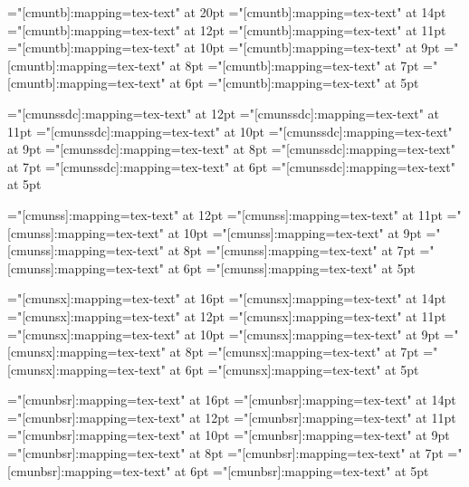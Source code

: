 \font\twentyttbf="[cmuntb]:mapping=tex-text"     at 20pt
\font\fourteenttbf="[cmuntb]:mapping=tex-text"   at 14pt
\font\twelvettbf="[cmuntb]:mapping=tex-text"     at 12pt
\font\eleventtbf="[cmuntb]:mapping=tex-text"     at 11pt
\font\tenttbf="[cmuntb]:mapping=tex-text"        at 10pt
\font\ninettbf="[cmuntb]:mapping=tex-text"       at 9pt
\font\eighttbft="[cmuntb]:mapping=tex-text"      at 8pt
\font\seventtbf="[cmuntb]:mapping=tex-text"      at 7pt
\font\sixttbf="[cmuntb]:mapping=tex-text"        at 6pt
\font\fivettbf="[cmuntb]:mapping=tex-text"       at 5pt

\font\twelvessdc="[cmunssdc]:mapping=tex-text"  at 12pt
\font\elevenssdc="[cmunssdc]:mapping=tex-text"  at 11pt
\font\tenssdc="[cmunssdc]:mapping=tex-text"     at 10pt
\font\ninessdc="[cmunssdc]:mapping=tex-text"    at 9pt
\font\eightssdc="[cmunssdc]:mapping=tex-text"   at 8pt
\font\sevenssdc="[cmunssdc]:mapping=tex-text"   at 7pt
\font\sixssdc="[cmunssdc]:mapping=tex-text"     at 6pt
\font\fivessdc="[cmunssdc]:mapping=tex-text"    at 5pt

\font\twelvess="[cmunss]:mapping=tex-text"      at 12pt
\font\elevenss="[cmunss]:mapping=tex-text"      at 11pt
\font\tenss="[cmunss]:mapping=tex-text"         at 10pt
\font\niness="[cmunss]:mapping=tex-text"        at 9pt
\font\eightss="[cmunss]:mapping=tex-text"       at 8pt
\font\sevenss="[cmunss]:mapping=tex-text"       at 7pt
\font\sixss="[cmunss]:mapping=tex-text"         at 6pt
\font\fivess="[cmunss]:mapping=tex-text"        at 5pt

\font\sixteenssbf="[cmunsx]:mapping=tex-text"  at 16pt
\font\fourteenssbf="[cmunsx]:mapping=tex-text" at 14pt
\font\twelvessbf="[cmunsx]:mapping=tex-text"   at 12pt
\font\elevenssbf="[cmunsx]:mapping=tex-text"   at 11pt
\font\tenssbf="[cmunsx]:mapping=tex-text"      at 10pt
\font\ninessbf="[cmunsx]:mapping=tex-text"     at 9pt
\font\eightssbf="[cmunsx]:mapping=tex-text"    at 8pt
\font\sevenssbf="[cmunsx]:mapping=tex-text"    at 7pt
\font\sixssbf="[cmunsx]:mapping=tex-text"      at 6pt
\font\fivessbf="[cmunsx]:mapping=tex-text"     at 5pt

\font\sixteenssmbf="[cmunbsr]:mapping=tex-text"  at 16pt
\font\fourteenssmbf="[cmunbsr]:mapping=tex-text" at 14pt
\font\twelvessmbf="[cmunbsr]:mapping=tex-text"   at 12pt
\font\elevenssmbf="[cmunbsr]:mapping=tex-text"   at 11pt
\font\tenssmbf="[cmunbsr]:mapping=tex-text"      at 10pt
\font\ninessmbf="[cmunbsr]:mapping=tex-text"     at 9pt
\font\eightssmbf="[cmunbsr]:mapping=tex-text"    at 8pt
\font\sevenssmbf="[cmunbsr]:mapping=tex-text"    at 7pt
\font\sixssmbf="[cmunbsr]:mapping=tex-text"      at 6pt
\font\fivessmbf="[cmunbsr]:mapping=tex-text"     at 5pt

